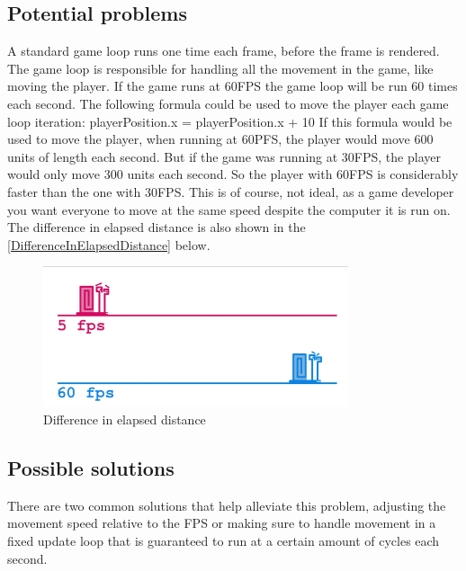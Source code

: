 \documentclass{article} %
\begin{document}
\subsection{Potential problems}
A standard game loop runs one time each frame, before the frame is rendered.
The game loop is responsible for handling all the movement in the game, like moving the player.
If the game runs at 60FPS the game loop will be run 60 times each second.
\newline\newline
The following formula could be used to move the player each game loop iteration:
\newline
playerPosition.x = playerPosition.x + 10
\newline\newline
If this formula would be used to move the player, when running at 60PFS, the player would move 600 units of length each second.
But if the game was running at 30FPS, the player would only move 300 units each second.
So the player with 60FPS is considerably faster than the one with 30FPS.
This is of course, not ideal, as a game developer you want everyone to move at the same speed despite the computer it is run on.
The difference in elapsed distance is also shown in the \autoref{DifferenceInElapsedDistance} below.
\begin{figure}[h!]
	\centering
	\includegraphics[width=0.8\textwidth]{difference_in_distance.png}
	\caption{Difference in elapsed distance}
	\label{DifferenceInElapsedDistance}
\end{figure}

\subsection{Possible solutions}
There are two common solutions that help alleviate this problem, adjusting the movement speed relative to the FPS or making sure to handle movement in a fixed update loop that is guaranteed to run at a certain amount of cycles each second.
\end{document}
